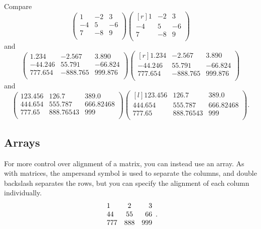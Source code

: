 \documentclass[a4paper,11pt]{article}
\begin{document}
Compare
\[ 
\begin{pmatrix} 
 	1   & -2   & 3 \\ 
 	-4  & 5    & -6 \\
 	7   & -8   & 9 \\
\end{pmatrix}
\begin{pmatrix*}[r] 	%
 	1   & -2   & 3 \\ 
 	-4  & 5    & -6 \\
	 7   & -8   & 9 \\
\end{pmatrix*}
\]
and
\[ 
\begin{pmatrix} 
 	1.234    & -2.567    & 3.890 \\ 
 	-44.246  & 55.791    & -66.824 \\
 	777.654  & -888.765  & 999.876 \\
\end{pmatrix}
\begin{pmatrix*}[r] 	%
 	1.234    & -2.567    & 3.890 \\ 
 	-44.246  & 55.791    & -66.824 \\
 	777.654  & -888.765  & 999.876 \\
\end{pmatrix*}
\]
and 
\[ 
\begin{pmatrix} 
 	123.456  & 126.7       & 389.0 \\ 
 	444.654  & 555.787     & 666.82468 \\
 	777.65   & 888.76543   & 999 \\
\end{pmatrix}
\begin{pmatrix*}[l] 	%
 	123.456  & 126.7       & 389.0 \\ 
 	444.654  & 555.787     & 666.82468 \\
 	777.65   & 888.76543   & 999 \\
\end{pmatrix*}.
\]
 
\subsection{Arrays}

For more control over alignment of a matrix, you can instead use an array. As with matrices, the ampersand symbol is used to separate the columns, and double backslash separates the rows, but you can specify the alignment of each column individually.
\[
\begin{array}{l c r} %
 1   & 2   & 3\\  
 44  & 55  & 66\\
 777 & 888 & 999  
\end{array}.
\]
\end{document}
